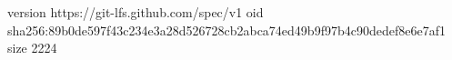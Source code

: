version https://git-lfs.github.com/spec/v1
oid sha256:89b0de597f43c234e3a28d526728cb2abca74ed49b9f97b4c90dedef8e6e7af1
size 2224
